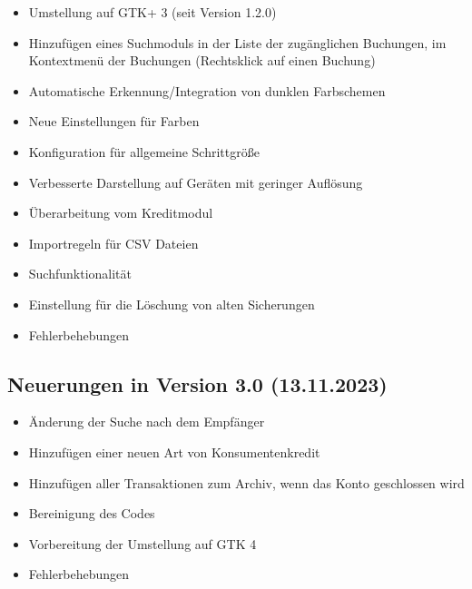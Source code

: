 \begin{itemize}
	\item Umstellung auf \gls{GTK}+ 3 (seit Version 1.2.0)%
	\item Hinzufügen eines Suchmoduls in der Liste der zugänglichen Buchungen, im Kontextmenü der Buchungen (Rechtsklick auf einen Buchung)%
	\item Automatische Erkennung/Integration von dunklen Farbschemen%
	\item Neue Einstellungen für Farben%
	\item Konfiguration für allgemeine Schrittgröße%
	\item Verbesserte Darstellung auf Geräten mit geringer Auflösung%
	\item Überarbeitung vom Kreditmodul%
	\item Importregeln für \gls{CSV} Dateien%
	\item Suchfunktionalität%
	\item Einstellung für die Löschung von alten Sicherungen%
	\item Fehlerbehebungen%
\end{itemize}


\subsection{Neuerungen in Version 3.0 \textnormal{(13.11.2023)}}%

\begin{itemize}
	\item Änderung der Suche nach dem Empfänger%
	\item Hinzufügen einer neuen Art von Konsumentenkredit%
	\item Hinzufügen aller Transaktionen zum Archiv, wenn das Konto geschlossen wird%
	\item Bereinigung des Codes%
	\item Vorbereitung der Umstellung auf \gls{GTK} 4%
	\item Fehlerbehebungen%
\end{itemize}

